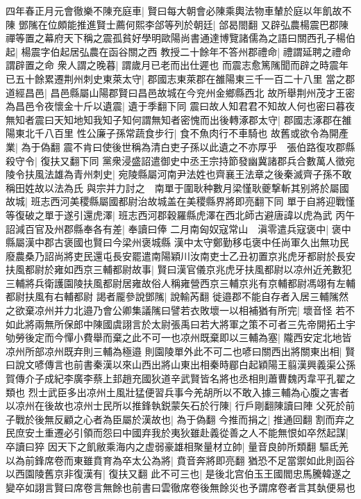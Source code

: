 四年春正月元會徹樂不陳充庭車|{
	賢曰每大朝會必陳乘輿法物車輦於庭以年飢故不陳}
鄧隲在位頗能推進賢士薦何熙李郃等列於朝廷|{
	郃曷閤翻}
又辟弘農楊震巴郡陳禪等置之幕府天下稱之震孤貧好學明歐陽尚書通達博覽諸儒為之語曰關西孔子楊伯起|{
	楊震字伯起居弘農在函谷關之西}
教授二十餘年不答州郡禮命|{
	禮謂延聘之禮命謂辟置之命}
衆人謂之晚暮|{
	謂歲月已老而出仕遲也}
而震志愈篤隲聞而辟之時震年已五十餘累遷荆州刺史東萊太守|{
	郡國志東萊郡在雒陽東三千一百二十八里}
當之郡道經昌邑|{
	昌邑縣屬山陽郡賢曰昌邑故城在今兖州金鄉縣西北}
故所舉荆州茂才王密為昌邑令夜懷金十斤以遺震|{
	遺于季翻下同}
震曰故人知君君不知故人何也密曰暮夜無知者震曰天知地知我知子知何謂無知者密愧而出後轉涿郡太守|{
	郡國志涿郡在雒陽東北千八百里}
性公廉子孫常蔬食步行|{
	食不魚肉行不車騎也}
故舊或欲令為開產業|{
	為于偽翻}
震不肯曰使後世稱為清白吏子孫以此遺之不亦厚乎　張伯路復攻郡縣殺守令|{
	復扶又翻下同}
黨衆浸盛詔遣御史中丞王宗持節發幽冀諸郡兵合數萬人徵宛陵令扶風法雄為青州刺史|{
	宛陵縣屬河南尹法姓也齊襄王法章之後秦滅齊子孫不敢稱田姓故以法為氏}
與宗并力討之　南單于圍耿种數月梁慬耿夔撃斬其别將於屬國故城|{
	班志西河美稷縣屬國都尉治故城盖在美稷縣界將即亮翻下同}
單于自將迎戰慬等復破之單于遂引還虎澤|{
	班志西河郡穀羅縣虎澤在西北師古避唐諱以虎為武}
丙午詔減百官及州郡縣奉各有差|{
	奉讀曰俸}
二月南匈奴寇常山　滇零遣兵寇褒中|{
	褒中縣屬漢中郡古褒國也賢曰今梁州褒城縣}
漢中太守鄭勤移屯褒中任尚軍久出無功民廢農桑乃詔尚將吏民還屯長安罷遣南陽穎川汝南吏士乙丑初置京兆虎牙都尉於長安扶風都尉於雍如西京三輔都尉故事|{
	賢曰漢官儀京兆虎牙扶風都尉以凉州近羌數犯三輔將兵衛護園陵扶風都尉居雍故俗人稱雍營西京三輔京兆有京輔都尉馮翊有左輔都尉扶風有右輔都尉}
謁者龎參說鄧隲|{
	說輸芮翻}
徙邉郡不能自存者入居三輔隲然之欲棄凉州并力北邉乃會公卿集議隲曰譬若衣敗壞一以相補猶有所完|{
	壞音怪}
若不如此將兩無所保郎中陳國虞詡言於太尉張禹曰若大將軍之策不可者三先帝開拓土宇劬勞後定而今憚小費舉而棄之此不可一也凉州既棄即以三輔為塞|{
	隴西安定北地皆凉州所部凉州既弃則三輔為極邉}
則園陵單外此不可二也喭曰關西出將關東出相|{
	賢曰說文喭傳言也前書秦漢以來山西出將山東出相秦時郿白起穎陽王翦漢興義渠公孫賀傳介子成紀李廣李蔡上邽趙充國狄道辛武賢皆名將也丞相則蕭曹魏丙韋平孔翟之類也}
烈士武臣多出凉州土風壯猛便習兵事今羌胡所以不敢入據三輔為心腹之害者以凉州在後故也凉州士民所以推鋒執鋭蒙矢石於行陳|{
	行戶剛翻陳讀曰陣}
父死於前子戰於後無反顧之心者為臣屬於漢故也|{
	為于偽翻}
今推而捐之|{
	推通回翻}
割而弃之民庶安土重遷必引領而怨曰中國弃我於夷狄雖赴義從善之人不能無恨如卒然起謀|{
	卒讀曰猝}
因天下之飢敝乘海内之虚弱豪雄相聚量材立帥|{
	量音良帥所類翻}
驅氐羌以為前鋒席卷而東雖賁育為卒太公為將|{
	賁音奔將即亮翻}
猶恐不足當禦如此則函谷以西園陵舊京非復漢有|{
	復扶又翻}
此不可三也|{
	是後北宫伯玉王國閻忠馬騰韓遂之變卒如詡言賢曰席卷言無餘也前書曰雲徹席卷後無餘災也予謂席卷者言其埶便易也}
